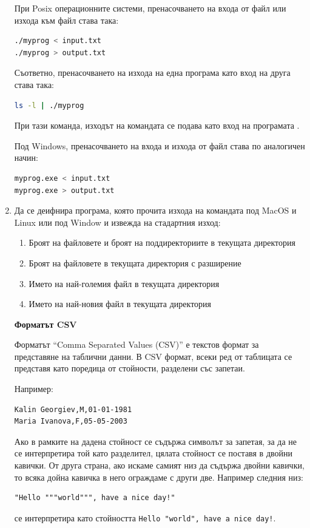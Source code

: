 \begin{enumerate}[]
\begin{mdframed}[hidealllines=true,backgroundcolor=gray!20]
При Posix операционните системи, пренасочването на входа от файл или изхода към файл става така: 
\begin{lstlisting}[basicstyle=\small,language=bash]
./myprog < input.txt
./myprog > output.txt
\end{lstlisting}

Съответно, пренасочването на изхода на една програма като вход на друга става така:
\begin{lstlisting}[basicstyle=\small,language=bash]
ls -l | ./myprog
\end{lstlisting}
При тази команда, изходът на командата  се подава като вход на програмата .

Под Windows, пренасочването на входа и изхода от файл става по аналогичен начин:
\begin{lstlisting}[basicstyle=\small,language=bash]
myprog.exe < input.txt
myprog.exe > output.txt
\end{lstlisting}
\end{mdframed}

\item Да се деифнира програма, която прочита изхода на командата  под MacOS и Linux или  под Window и извежда на стадартния изход:
\begin{enumerate}[label=\alph*)]
	\item Броят на файловете и броят на поддиректориите в текущата директория
	\item Броят на файловете в текущата директория с разширение 
	\item Името на най-големия файл в текущата директория
	\item Името на най-новия файл в текущата директория
\end{enumerate}

\begin{mdframed}[hidealllines=true,backgroundcolor=gray!20]
\textbf{Форматът CSV}


Форматът ``Comma Separated Values (CSV)'' е текстов формат за представяне на таблични данни. В CSV формат, всеки ред от таблицата се представя като поредица от стойности, разделени със запетаи. 

Например:
\begin{verbatim}
Kalin Georgiev,M,01-01-1981
Maria Ivanova,F,05-05-2003
\end{verbatim}

Ако в рамките на дадена стойност се съдържа символът за запетая, за да не се интерпретира той като разделител, цялата стойност се поставя в двойни кавички. От друга страна, ако искаме самият низ да съдържа двойни кавички, то всяка дойна кавичка в него ограждаме с други две. Например следния низ:
\begin{verbatim}
"Hello """world""", have a nice day!"
\end{verbatim}
се интерпретира като стойността \verb#Hello "world", have a nice day!#.


\end{mdframed}
\end{enumerate}
